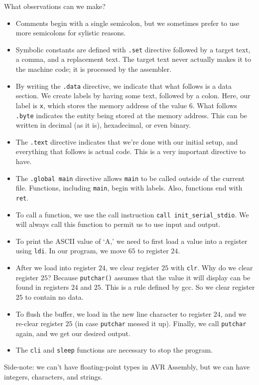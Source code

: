 What observations can we make? 
\begin{itemize}
    \item Comments begin with a single semicolon, but we sometimes prefer to use more semicolons for sylistic reasons.
    \item Symbolic constants are defined with \verb!.set! directive followed by a target text, a comma, and a replacement text. The target text never actually makes it to the machine code; it is processed by the assembler.
    \item By writing the \verb!.data! directive, we indicate that what follows is a data section. We create labels by having some text, followed by a colon. Here, our label is \verb!x!, which stores the memory address of the value $6$. What follows \verb!.byte! indicates the entity being stored at the memory address. This can be written in decimal (as it is), hexadecimal, or even binary. 
    \item The \verb!.text! directive indicates that we're done with our initial setup, and everything that follows is actual code. This is a very important directive to have.
    \item The \verb!.global main! directive allows \verb!main! to be called outside of the current file. Functions, including \verb!main!, begin with labels. Also, functions end with \verb!ret!. 
    \item To call a function, we use the call instruction \verb!call init_serial_stdio!. We will always call this function to permit us to use input and output.
    \item To print the ASCII value of `A,' we need to first load a value into a register using \verb!ldi!. In our program, we move $65$ to register $24$. 
    \item After we load into register $24$, we clear register $25$ with \verb!clr!. Why do we clear register $25$? Because \verb!putchar()! assumes that the value it will display can be found in registers $24$ and $25$. This is a rule defined by gcc. So we clear register $25$ to contain no data.
    \item To flush the buffer, we load in the new line character to register $24$, and we re-clear register $25$ (in case \verb!putchar! messed it up). Finally, we call \verb!putchar! again, and we get our desired output.
    \item The \verb!cli! and \verb!sleep! functions are necessary to stop the program. 
\end{itemize}










Side-note: we can't have floating-point types in AVR Assembly, but we can have integers, characters, and strings. 